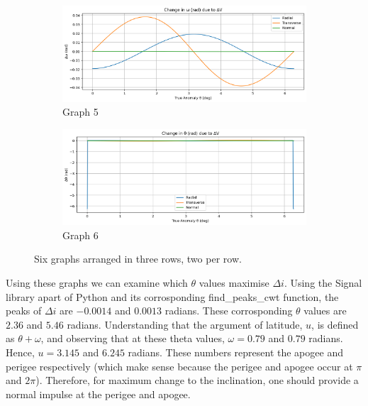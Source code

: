 \documentclass[a4paper, 12pt]{article}  %
\begin{document}
\begin{figure}[H]
        \begin{subfigure}[t]{0.45\textwidth}
            \centering
            \includegraphics[width=\linewidth]{Images/del_lomega.png}
            \caption{Graph 5}
            \label{fig:graph5}
        \end{subfigure}
        \hspace{0.05\textwidth}
        \begin{subfigure}[t]{0.45\textwidth}
            \centering
            \includegraphics[width=\linewidth]{Images/del_theta.png}
            \caption{Graph 6}
            \label{fig:graph6}
        \end{subfigure}
    
        \caption{Six graphs arranged in three rows, two per row.}
        \label{fig:six_graphs}
    \end{figure}
Using these graphs we can examine which $\theta$ values maximise $\Delta i$. Using the Signal library apart of Python
and its corrosponding find\_peaks\_cwt function, the peaks of $\Delta i$ are  $-0.0014$ and $0.0013$ radians.
These corrosponding $\theta$ values are $2.36$ and $5.46$ radians. Understanding that the argument of latitude, $u$,
is defined as $\theta + \omega$, and observing that at these theta values, $\omega = 0.79$ and $0.79$ radians.
Hence, $u = 3.145$ and $6.245$ radians. These numbers represent the apogee and perigee respectively (which make sense because the perigee and apogee 
occur at $\pi$ and $2\pi$). Therefore, for maximum change to the inclination, one should provide a normal impulse at the perigee and apogee.
\end{document}
